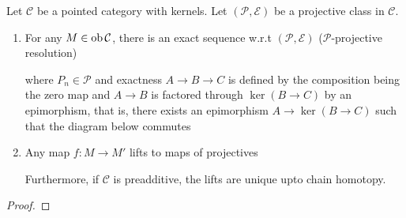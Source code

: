 \documentclass{report}
\begin{document}
\begin{theorem}
    Let $\mathcal{C}$ be a pointed category with kernels. Let $(\mathcal{P}, \mathcal{E})$ be a projective class in $\mathcal{C}$.
    \begin{enumerate}
        \item For any $M \in \operatorname{ob} \mathcal{C}$, there is an exact sequence w.r.t $(\mathcal{P}, \mathcal{E})$ ($\mathcal{P}$-projective resolution)
        \begin{center}
        \end{center}
        where $P_n \in \mathcal{P}$ and exactness $A \to B \to C$ is defined by the composition being the zero map and $A \to B$ is factored through $\ker (B \to C)$ by an epimorphism, that is, there exists an epimorphism $A \to \ker (B \to C)$ such that the diagram below commutes
        \begin{center}
        \end{center}

        \item Any map $f: M \to M'$ lifts to maps of projectives
        \begin{center}
        \end{center}
        Furthermore, if $\mathcal{C}$ is preadditive, the lifts are unique upto chain homotopy.
    \end{enumerate}
\end{theorem}

\begin{proof}
\end{proof}
\end{document}
